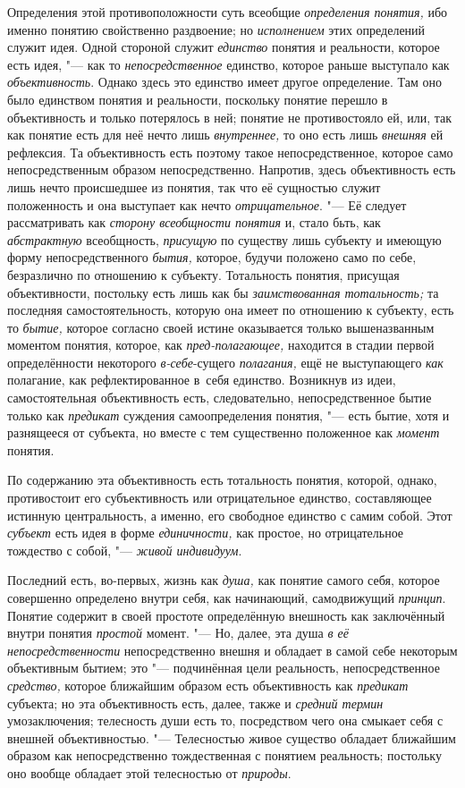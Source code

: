 Определения этой противоположности суть всеобщие {\em определения понятия,}
ибо именно понятию свойственно раздвоение; но {\em исполнением} этих
определений служит идея. Одной стороной служит {\em единство} понятия и
реальности, которое есть идея, "--- как то {\em непосредственное}
единство, которое раньше выступало как {\em объективность}.
Однако здесь это единство имеет другое определение. Там оно
было единством понятия и реальности, поскольку понятие перешло в
объективность и только потерялось в ней; понятие не противостояло ей, или,
так как понятие есть для неё нечто лишь
{\em внутреннее,} то оно есть лишь {\em внешняя}
ей рефлексия. Та объективность есть поэтому такое
непосредственное, которое само непосредственным образом непосредственно.
Напротив, здесь объективность есть лишь нечто происшедшее из понятия, так
что её сущностью служит положенность и она выступает как нечто
{\em отрицательное}. "--- Её следует рассматривать как {\em сторону
всеобщности понятия} и, стало бьть, как {\em абстрактную}
всеобщность, {\em присущую} по
существу лишь субъекту и имеющую форму непосредственного {\em бытия,} которое,
будучи положено само по себе, безразлично по отношению к субъекту.
Тотальность понятия, присущая объективности, постольку есть лишь как бы
{\em заимствованная тотальность;}
та последняя самостоятельность, которую она
имеет по отношению к субъекту, есть то {\em бытие,} которое
согласно своей истине оказывается только вышеназванным моментом понятия,
которое, как {\em пред-полагающее,}
находится в стадии первой определённости некоторого
{\em в-себе}-сущего {\em полагания,} ещё не выступающего {\em как}
полагание, как рефлектированное в~себя единство. Возникнув
из идеи, самостоятельная объективность есть, следовательно,
непосредственное бытие только как {\em предикат} суждения
самоопределения понятия, "--- есть бытие, хотя и разнящееся от
субъекта, но вместе с тем существенно положенное как {\em момент} понятия.

По содержанию эта объективность есть тотальность понятия,
которой, однако, противостоит его субъективность или отрицательное
единство, составляющее истинную центральность, а именно, его свободное
единство с самим собой. Этот {\em субъект} есть идея в
форме {\em единичности,} как простое, но отрицательное тождество
с собой, "--- {\em живой индивидуум}.

Последний есть, во-первых, жизнь как {\em душа,} как понятие
самого себя, которое совершенно определено внутри себя, как начинающий,
самодвижущий {\em принцип}.
Понятие содержит в своей простоте определённую внешность как
заключённый внутри понятия
{\em простой} момент. "---
Но, далее, эта душа {\em в
её непосредственности} непосредственно внешня и обладает в
самой себе некоторым объективным бытием; это "--- подчинённая
цели реальность, непосредственное
{\em средство,} которое
ближайшим образом есть объективность как
{\em предикат} субъекта;
но эта объективность есть, далее, также и
{\em средний термин}
умозаключения; телесность души есть то, посредством чего она
смыкает себя с внешней объективностью. "--- Телесностью живое
существо обладает ближайшим образом как непосредственно тождественная с
понятием реальность; постольку оно вообще обладает этой телесностью от
{\em природы}.

